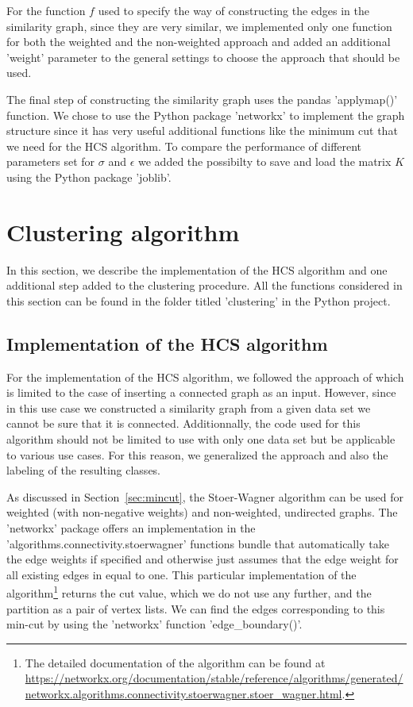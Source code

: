 \documentclass[paper=a4,fontsize=11pt,DIV=8,BCOR=5mm,twoside,pdftex,bibtotocnumbered]{scrreprt}
\theoremstyle{plain}
\begin{document}
For the function $f$ used to specify the way of constructing the edges in the similarity graph, since they are very similar, we implemented only one function for both the weighted and the non-weighted approach and added an additional 'weight' parameter to the general settings to choose the approach that should be used.

The final step of constructing the similarity graph uses the pandas 'applymap()' function. We chose to use the Python package 'networkx' to implement the graph structure since it has very useful additional functions like the minimum cut that we need for the HCS algorithm. To compare the performance of different parameters set for $\sigma$ and $\epsilon$ we added the possibilty to save and load the matrix $K$ using the Python package 'joblib'. 

\section{Clustering algorithm}\label{sec:clustering_impl}
In this section, we describe the implementation of the HCS algorithm and one additional step added to the clustering procedure. All the functions considered in this section can be found in the folder titled 'clustering' in the Python project.

\subsection{Implementation of the HCS algorithm}
For the implementation of the HCS algorithm, we followed the approach of \cite{Gert2020} which is limited to the case of inserting a connected graph as an input. However, since in this use case we constructed a similarity graph from a given data set we cannot be sure that it is connected. Additionnally, the code used for this algorithm should not be limited to use with only one data set but be applicable to various use cases. For this reason, we generalized the approach and also the labeling of the resulting classes.

As discussed in Section~\ref{sec:mincut}, the Stoer-Wagner algorithm can be used for weighted (with non-negative weights) and non-weighted, undirected graphs. The 'networkx' package offers an implementation in the 'algorithms.connectivity.stoerwagner' functions bundle that automatically take the edge weights if specified and otherwise just assumes that the edge weight for all existing edges in equal to one. This particular implementation of the algorithm\footnote{The detailed documentation of the algorithm can be found at \url{https://networkx.org/documentation/stable/reference/algorithms/generated/networkx.algorithms.connectivity.stoerwagner.stoer_wagner.html}.} returns the cut value, which we do not use any further, and the partition as a pair of vertex lists. We can find the edges corresponding to this min-cut by using the 'networkx' function 'edge\_boundary()'.
\end{document}
